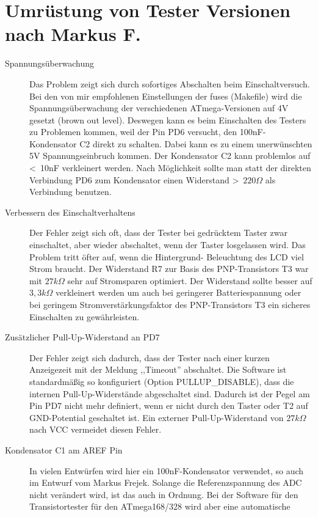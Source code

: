 \section{Umrüstung von Tester Versionen nach Markus F.}
\label{sec:change_markus}
\begin{description}

\item[Spannungsüberwachung]  
Das Problem zeigt sich durch sofortiges Abschalten beim Einschaltversuch.
Bei den von mir empfohlenen Einstellungen der fuses (Makefile) wird die Spannungsüberwachung der
verschiedenen ATmega-Versionen auf 4V gesetzt (brown out level). Deswegen kann es beim
Einschalten des Testers zu Problemen kommen, weil der Pin PD6 versucht, den 100nF-Kondensator C2
direkt zu schalten. Dabei kann es zu einem unerwünschten 5V Spannungseinbruch kommen.
Der Kondensator C2 kann problemlos auf \textless~10nF verkleinert werden. Nach Möglichkeit sollte
man statt der direkten Verbindung PD6 zum Kondensator einen Widerstand \textgreater~\(220 \Omega\) 
als Verbindung benutzen.
\item[Verbessern des Einschaltverhaltens]
Der Fehler zeigt sich oft, dass der Tester bei gedrücktem Taster zwar einschaltet, aber wieder
abschaltet, wenn der Taster losgelassen wird. Das Problem tritt öfter auf, wenn die Hintergrund-
Beleuchtung des LCD viel Strom braucht.
Der Widerstand R7 zur Basis des PNP-Transistors T3 war mit \(27k \Omega\) sehr auf Stromsparen
optimiert. Der Widerstand sollte besser auf \(3,3k \Omega\) verkleinert werden um auch bei
geringerer Batteriespannung oder bei geringem Stromverstärkungsfaktor des PNP-Transistors T3
ein sicheres Einschalten zu gewährleisten.
\item[Zusätzlicher Pull-Up-Widerstand an PD7]
Der Fehler zeigt sich dadurch, dass der Tester nach einer kurzen Anzeigezeit mit der Meldung
,,Timeout'' abschaltet. Die Software ist standardmäßig so konfiguriert (Option PULLUP\_DISABLE),
dass die internen Pull-Up-Widerstände abgeschaltet sind.
Dadurch ist der Pegel am Pin PD7 nicht mehr definiert,
wenn er nicht durch den Taster oder T2 auf GND-Potential geschaltet ist. Ein externer
Pull-Up-Widerstand von \(27k \Omega\) nach VCC vermeidet diesen Fehler.
\item[Kondensator C1 am AREF Pin]
In vielen Entwürfen wird hier ein 100nF-Kondensator verwendet, so auch im Entwurf vom Markus Frejek.
Solange die Referenzspannung des ADC nicht verändert wird, ist das auch in Ordnung.
Bei der Software für den Transistortester für den ATmega168/328 wird aber eine automatische

\end{description}
